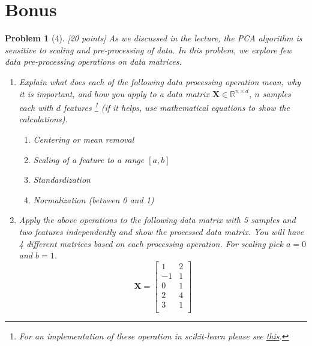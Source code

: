 \documentclass[12pt]{article}
\theoremstyle{quest}
\newtheorem*{problem}{Problem}
\begin{document}
\newpage
\section*{Bonus}
\begin{problem}[4] [20 points]
As we discussed in the lecture, the PCA algorithm is sensitive to scaling and pre-processing of data. In this problem, we explore few data pre-processing operations on data matrices.

\begin{enumerate}
    \item Explain what does each of the following data processing operation mean, why it is important, and how you apply to a data matrix $\bm{X} \in \mathbb{R}^{n \times d}$, $n$ samples each with $d$ features \footnote{For an implementation of these operation in \textsf{scikit-learn} please see \href{https://scikit-learn.org/stable/modules/preprocessing.html}{this}.} (if it helps, use mathematical equations to show the calculations).
    \begin{enumerate}
        \item Centering or mean removal
        \item Scaling of a feature to a range $[a, b]$
        \item Standardization
        \item Normalization (between 0 and 1)
    \end{enumerate}
    \item Apply the above operations to the following data matrix with 5 samples and two features independently and show the processed data matrix. You will have 4 different matrices based on each processing operation. For scaling pick $a = 0$ and $b = 1$.
        \begin{equation*}
            \bm{X} = \begin{bmatrix}
            1 & 2\\
            -1 & 1\\
            0 & 1\\
            2 & 4\\
            3 & 1\\
            \end{bmatrix}
        \end{equation*}
\end{enumerate}
\end{problem}

\end{document}
